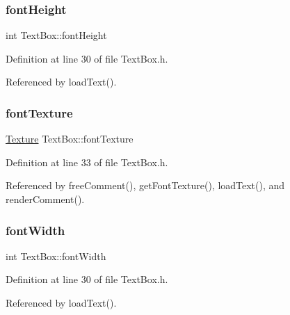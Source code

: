 \subsubsection{\texorpdfstring{font\+Height}{fontHeight}}
{\footnotesize\ttfamily int Text\+Box\+::font\+Height\hspace{0.3cm}{\ttfamily [private]}}



Definition at line 30 of file Text\+Box.\+h.



Referenced by load\+Text().

\mbox{\label{class_text_box_a94e1863fccbb2e8de3547aa89b8e85f0}} 
\subsubsection{\texorpdfstring{font\+Texture}{fontTexture}}
{\footnotesize\ttfamily \hyperlink{class_texture}{Texture} Text\+Box\+::font\+Texture\hspace{0.3cm}{\ttfamily [private]}}



Definition at line 33 of file Text\+Box.\+h.



Referenced by free\+Comment(), get\+Font\+Texture(), load\+Text(), and render\+Comment().

\mbox{\label{class_text_box_a55045d04b5804c912bd9be29bc8478b9}} 
\subsubsection{\texorpdfstring{font\+Width}{fontWidth}}
{\footnotesize\ttfamily int Text\+Box\+::font\+Width\hspace{0.3cm}{\ttfamily [private]}}



Definition at line 30 of file Text\+Box.\+h.



Referenced by load\+Text().

\mbox{\label{class_text_box_a13ec32aabf23db2253af70f19a2bf1e9}} 
